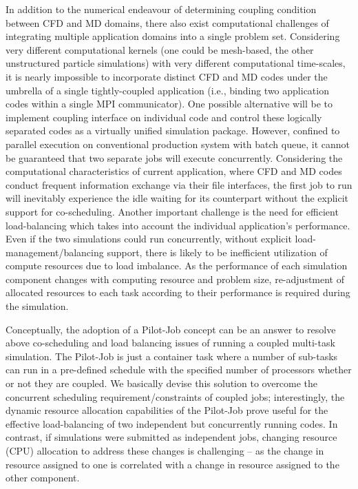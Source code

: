 \documentclass[conference,final]{IEEEtran}
\newcommand{\skonote}[1]{ {\textcolor{blue} { ***Jeff: #1 }}}
\newcommand{\skonote}[1]{}
\begin{document}
In addition to the numerical endeavour of determining coupling condition between CFD and MD domains, there also exist computational challenges of integrating multiple application domains into a single problem set. Considering very different computational kernels (one could be mesh-based, the other unstructured particle simulations) with very different computational time-scales, it is nearly impossible to incorporate distinct CFD and MD codes under the umbrella of a single tightly-coupled application (i.e., binding two application codes within a single MPI communicator). One possible alternative will be to implement coupling interface on individual code and control these logically separated codes as a virtually unified simulation package.
However, confined to parallel execution on conventional production system with batch queue, it cannot be guaranteed that two separate jobs will execute concurrently. Considering the computational characteristics of current application, where CFD and MD codes conduct frequent information exchange via their file interfaces, the first job to run will inevitably experience the idle waiting for its counterpart without the explicit support for co-scheduling. Another important challenge is the need for efficient load-balancing which takes into account the individual application's performance. Even if the two simulations could run concurrently, without explicit load-management/balancing support, there is likely to be inefficient utilization of compute resources due to load imbalance. As the performance of each simulation component changes with computing resource and problem size, re-adjustment of allocated resources to each task according to their performance is required during the simulation.
\newline

Conceptually, the adoption of a Pilot-Job concept can be an answer to resolve above co-scheduling and load balancing issues of running a coupled multi-task simulation. The Pilot-Job is just a container task where a number of sub-tasks can run in a pre-defined schedule with the specified number of processors whether or not they are coupled. We basically devise this solution to overcome the concurrent scheduling requirement/constraints of coupled jobs; interestingly, the dynamic resource allocation capabilities of the Pilot-Job prove useful for the effective load-balancing of two independent but concurrently running codes. In contrast, if simulations were submitted as independent jobs, changing resource (CPU) allocation to address these changes is challenging -- as the change in resource assigned to one is correlated with a change in resource assigned to the other component.
\newline
\end{document}
